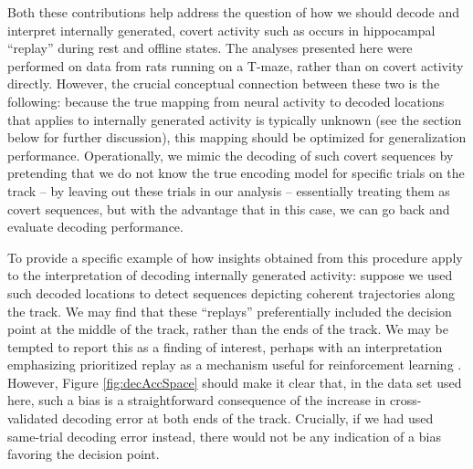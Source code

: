 \documentclass[11pt]{article}
\let\cite=\citep
\begin{document}
Both these contributions help address the question of how we should
decode {\color{red} and interpret} internally generated, covert
activity such as occurs in hippocampal ``replay'' during rest and
offline states. The analyses presented here were performed on data
from rats running on a T-maze, rather than on covert activity
directly. However, the crucial conceptual connection between these two
is the following: because the true mapping from neural activity to
{\color{red} decoded} locations {\color{red} that applies to}
internally generated activity is typically unknown (see the section
below for further discussion), this mapping should be optimized for
generalization performance. Operationally, we mimic the decoding of
such covert sequences by pretending that we do not know the true
encoding model for specific trials on the track {\color{red} --} by
leaving out these trials in our analysis {\color{red} --} essentially
  treating them as covert sequences{\color{red},} but with the
  advantage that in this case, we can go back and evaluate decoding
  performance.

To provide a specific example of how insights obtained from this
procedure {\color{red} apply} to the interpretation of decoding
internally generated activity: suppose we used such decoded locations
to detect sequences depicting coherent trajectories along the
track. We may find that these ``replays'' preferentially included the
decision point {\color{red} at the middle of the track}, rather than
the ends of the track. We may be tempted to report this as a finding
of interest, perhaps with an interpretation {\color{red} emphasizing
  prioritized replay as a mechanism useful for reinforcement learning
  \cite{Schaul2015,Gershman2017a}. However, Figure
  \ref{fig:decAccSpace} should make it clear that, in the data set
  used here, such a bias is a straightforward consequence of the
  increase in cross-validated decoding error at both ends of the
  track. Crucially,} if we had used same-trial decoding error instead,
there would not be any indication of a bias favoring the decision
point.
\end{document}
